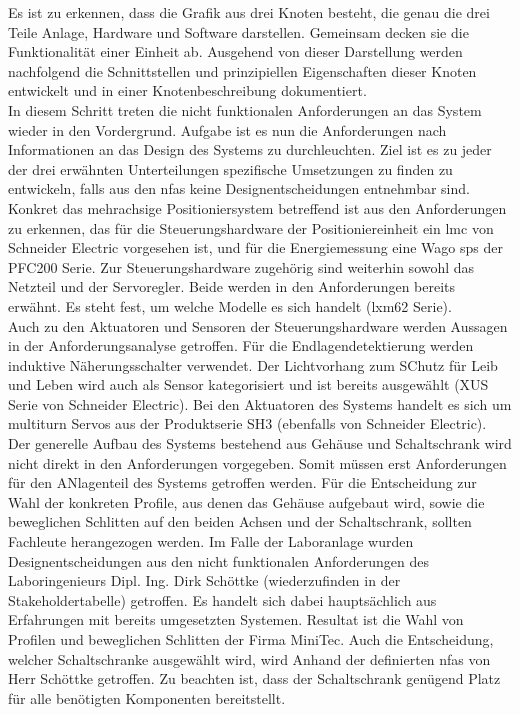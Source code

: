 \documentclass[../../../Bachelorarbeit.tex]{subfiles}
\begin{document}
Es ist zu erkennen, dass die Grafik aus drei Knoten besteht, die genau die drei Teile Anlage, Hardware und Software darstellen. Gemeinsam decken sie die Funktionalität einer Einheit ab. Ausgehend von dieser Darstellung werden nachfolgend die Schnittstellen und prinzipiellen Eigenschaften dieser Knoten entwickelt und in einer Knotenbeschreibung dokumentiert. \\ %
In diesem Schritt treten die nicht funktionalen Anforderungen an das System wieder in den Vordergrund. Aufgabe ist es nun die Anforderungen nach Informationen an das Design des Systems zu durchleuchten. Ziel ist es zu jeder der drei erwähnten Unterteilungen spezifische Umsetzungen zu finden \bzw zu entwickeln, falls aus den \acp{nfa} keine Designentscheidungen entnehmbar sind. \\
Konkret das mehrachsige Positioniersystem betreffend ist aus den Anforderungen zu erkennen, das für die Steuerungshardware der Positioniereinheit ein \ac{lmc} von Schneider Electric vorgesehen ist, und für die Energiemessung eine Wago \ac{sps} der PFC200 Serie. Zur Steuerungshardware zugehörig sind weiterhin sowohl das Netzteil und der Servoregler. Beide werden in den Anforderungen bereits erwähnt. Es steht fest, um welche Modelle es sich handelt (\acs{lxm}62 Serie).\\ 
Auch zu den Aktuatoren und Sensoren der Steuerungshardware werden Aussagen in der Anforderungsanalyse getroffen. Für die Endlagendetektierung werden induktive Näherungsschalter verwendet. Der Lichtvorhang zum SChutz für Leib und Leben wird auch als Sensor kategorisiert und ist bereits ausgewählt (XUS Serie von Schneider Electric). Bei den Aktuatoren des Systems handelt es sich um multiturn Servos aus der Produktserie SH3 (ebenfalls von Schneider Electric). \\
Der generelle Aufbau des Systems bestehend aus Gehäuse und Schaltschrank wird nicht direkt in den Anforderungen vorgegeben. Somit müssen erst Anforderungen für den ANlagenteil des Systems getroffen werden. Für die Entscheidung zur Wahl der konkreten Profile, aus denen das Gehäuse aufgebaut wird, sowie die beweglichen Schlitten auf den beiden Achsen und der Schaltschrank, sollten Fachleute herangezogen werden. Im Falle der Laboranlage wurden Designentscheidungen aus den nicht funktionalen Anforderungen des Laboringenieurs Dipl. Ing. Dirk Schöttke (wiederzufinden in der Stakeholdertabelle) getroffen. Es handelt sich dabei hauptsächlich aus Erfahrungen mit bereits umgesetzten Systemen. Resultat ist die Wahl von Profilen und beweglichen Schlitten der Firma MiniTec. Auch die Entscheidung, welcher Schaltschranke ausgewählt wird, wird Anhand der definierten \acp{nfa} von Herr Schöttke getroffen. Zu beachten ist, dass der Schaltschrank genügend Platz für alle benötigten Komponenten bereitstellt.\\
\end{document}
